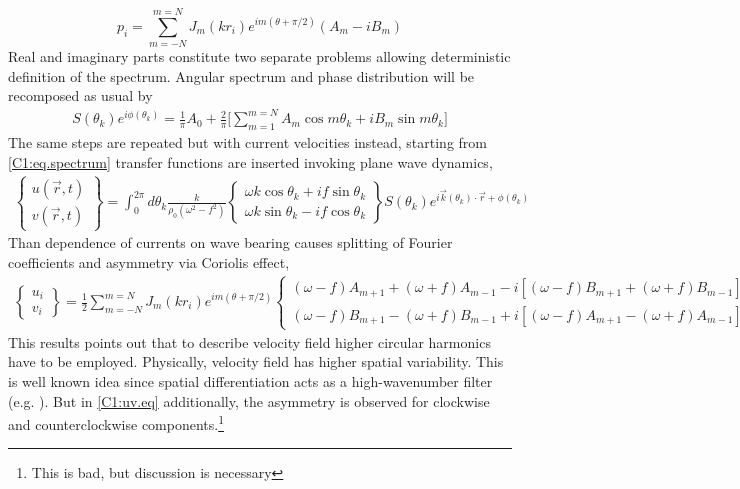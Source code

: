\begin{equation}
\label{C1:p.eq}
p_i = \sum_{m = -N}^{m = N} J_m(k r_i) e^{im(\theta + \pi/2)} (A_m  - i B_m)
\end{equation}
Real and imaginary parts constitute two separate problems allowing deterministic definition of the spectrum. Angular spectrum and phase distribution will be recomposed as usual by
\begin{align*}
S(\theta_k) e^{i \phi(\theta_k)} = \frac{1}{\pi} A_0 + \frac{2}{\pi} \big[ \sum_{m = 1}^{m = N} A_m \cos m\theta_k + i B_m \sin m\theta_k \big]
\end{align*}
The same steps are repeated but with current velocities instead, starting from \eqref{C1:eq.spectrum} transfer functions are inserted invoking plane wave dynamics,
\begin{align}
\begin{Bmatrix}
u(\vec{r}, t) \\ v(\vec{r}, t)
\end{Bmatrix}
=\int_0^{2\pi} d \theta_k \frac{k}{\rho_0 (\omega^2 - f^2)} 
\begin{Bmatrix}
\omega k \cos \theta_k + i f \sin \theta_k \\ \omega k \sin \theta_k - i f \cos \theta_k
\end{Bmatrix}
S(\theta_k) e^{i \vec{k}(\theta_k) \cdot \vec{r} + \phi(\theta_k)}
\end{align}
Than dependence of currents on wave bearing causes splitting of Fourier coefficients and asymmetry via Coriolis effect,
\begin{align}
\label{C1:uv.eq}
\begin{Bmatrix}
u_i \\ v_i
\end{Bmatrix}
= \frac{1}{2} \sum_{m = -N}^{m = N} J_{m} (kr_i) e^{im(\theta + \pi/2)}
\begin{Bmatrix}
(\omega - f) A_{m + 1} + (\omega + f) A_{m - 1} - i [(\omega - f) B_{m + 1} + (\omega + f) B_{m - 1}] \\ 
(\omega - f) B_{m + 1} - (\omega + f) B_{m - 1} + i [ (\omega - f) A_{m + 1} - (\omega + f) A_{m - 1}]
\end{Bmatrix}
\end{align}
This results points out that to describe velocity field higher circular harmonics have to be employed. Physically, velocity field has higher spatial variability. This is well known idea since spatial differentiation acts as a high-wavenumber filter (e.g. \cite{rhines1977dynamics}). But in \eqref{C1:uv.eq} additionally, the asymmetry is observed for clockwise and counterclockwise components.\footnote{This is bad, but discussion is necessary}

